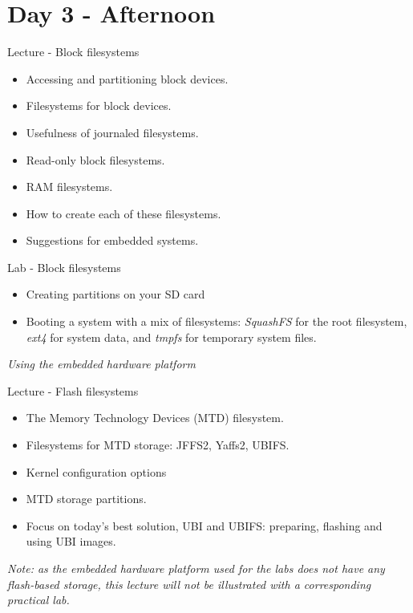 \documentclass[a4paper,12pt,obeyspaces,spaces,hyphens]{article}
\begin{document}
\section{Day 3 - Afternoon}

\feagendatwocolumn
{Lecture - Block filesystems}
{
  \begin{itemize}
  \item Accessing and partitioning block devices.
  \item Filesystems for block devices.
  \item Usefulness of journaled filesystems.
  \item Read-only block filesystems.
  \item RAM filesystems.
  \item How to create each of these filesystems.
  \item Suggestions for embedded systems.
  \end{itemize}
}
{Lab - Block filesystems}
{
  \begin{itemize}
  \item Creating partitions on your SD card
  \item Booting a system with a mix of filesystems: {\em SquashFS} for
    the root filesystem, {\em ext4} for system data, and {\em
      tmpfs} for temporary system files.
  \end{itemize}

  \vspace{0.5cm}
  {\em Using the embedded hardware platform}
}

\feagendaonecolumn
{Lecture - Flash filesystems}
{
  \begin{itemize}
  \item The Memory Technology Devices (MTD) filesystem.
  \item Filesystems for MTD storage: JFFS2, Yaffs2, UBIFS.
  \item Kernel configuration options
  \item MTD storage partitions.
  \item Focus on today's best solution, UBI and UBIFS:
	preparing, flashing and using UBI images.
  \end{itemize}

  \vspace{0.5cm}

  {\em Note: as the embedded hardware platform used for the labs does
    not have any flash-based storage, this lecture will not be
    illustrated with a corresponding practical lab.}
}
\end{document}
